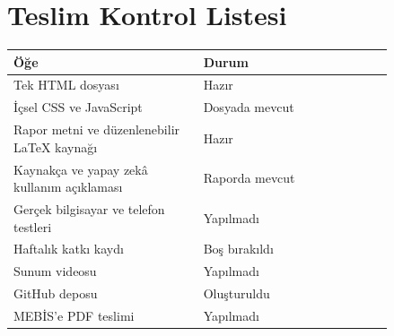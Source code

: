 \documentclass[11pt,a4paper]{article}
\begin{document}
\appendix
\section{Teslim Kontrol Listesi}
\begin{longtable}{|p{0.42\linewidth}|p{0.42\linewidth}|}
\hline \textbf{Öğe} & \textbf{Durum} \\ \hline\endhead
Tek HTML dosyası & Hazır \\ \hline
İçsel CSS ve JavaScript & Dosyada mevcut \\ \hline
Rapor metni ve düzenlenebilir LaTeX kaynağı & Hazır \\ \hline
Kaynakça ve yapay zekâ kullanım açıklaması & Raporda mevcut \\ \hline
Gerçek bilgisayar ve telefon testleri & Yapılmadı \\ \hline
Haftalık katkı kaydı & Boş bırakıldı \\ \hline
Sunum videosu & Yapılmadı \\ \hline
GitHub deposu & Oluşturuldu \\ \hline
MEBİS’e PDF teslimi & Yapılmadı \\ \hline
\end{longtable}
\end{document}
